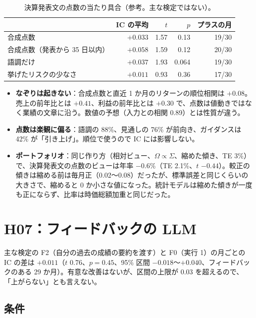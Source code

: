\documentclass[xelatex,ja=standard,jafont=haranoaji,a4paper,10pt,openany]{bxjsreport}
\begin{document}
\begin{table}[htbp]
\centering
\caption{決算発表文の点数の当たり具合（参考。主な検定ではない）。}
\small
\begin{tabular}{lrrrr}
\toprule
 & IC の平均 & $t$ & $p$ & プラスの月 \\
\midrule
合成点数 & $+0.033$ & 1.57 & 0.13 & 19/30 \\
合成点数（発表から 35 日以内） & $+0.058$ & 1.59 & 0.12 & 20/30 \\
語調だけ & $+0.037$ & 1.93 & 0.064 & 19/30 \\
挙げたリスクの少なさ & $+0.011$ & 0.93 & 0.36 & 17/30 \\
\bottomrule
\end{tabular}
\end{table}

\begin{itemize}
\item \textbf{なぞりは起きない}：合成点数と直近 1 か月のリターンの順位相関は $+0.08$。売上の前年比とは $+0.41$、利益の前年比とは $+0.30$ で、点数は値動きではなく業績の文章に沿う。数値の予想（入力との相関 0.89）とは性質が違う。
\item \textbf{点数は楽観に偏る}：語調の 88\%、見通しの 76\% が前向き、ガイダンスは 42\% が「引き上げ」。順位で使うので IC には影響しない。
\item \textbf{ポートフォリオ}：同じ作り方（相対ビュー、$\Omega\propto\Sigma$、縮めた傾き、TE 3\%）で、決算発表文の点数のビューは年率 $-0.6\%$（TE 2.1\%、$t$ $-0.44$）。較正の傾きは縮める前は毎月正（0.02〜0.08）だったが、標準誤差と同じくらいの大きさで、縮めると 0 か小さな値になった。統計モデルは縮めた傾きが一度も正にならず、比率は時価総額加重と同じだった。
\end{itemize}

\chapter{H07：フィードバックの LLM}\label{ch:h07}

\begin{verdict}[判定：結論を出すには証拠が不足している]
主な検定の F2（自分の過去の成績の要約を渡す）と F0（実行 1）の月ごとの IC の差は $+0.011$（$t$ 0.76、$p=0.45$、95\% 区間 $-0.018$〜$+0.040$、フィードバックのある 29 か月）。有意な改善はないが、区間の上限が 0.03 を超えるので、「上がらない」とも言えない。
\end{verdict}

\section{条件}
\end{document}
